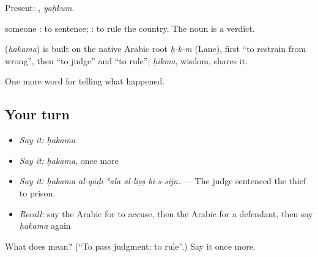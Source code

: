 Present: , \emph{yaḥkum}.

  someone : to sentence;  : to rule the country. The noun  is a verdict.

\begin{cousinweb}
\textbf{} (\emph{ḥakama}) is built on the native Arabic root \emph{ḥ-k-m} (Lane), first \textquotedblleft{}to restrain from wrong\textquotedblright{}, then \textquotedblleft{}to judge\textquotedblright{} and \textquotedblleft{}to rule\textquotedblright{}; \emph{ḥikma}, wisdom, shares it.
\end{cousinweb}

\begin{grammarlens}[title={What you've built}]
One more word for telling what happened.
\end{grammarlens}

\subsection*{Your turn}
\begin{itemize}
\raggedright
  \item \emph{Say it:} \emph{ḥakama}
  \item \emph{Say it:} \emph{ḥakama}, once more
  \item \emph{Say it:} \emph{ḥakama al-qāḍī ʿalā al-liṣṣ bi-s-sijn.} — The judge sentenced the thief to prison.
  \item \emph{Recall:} say the Arabic for to accuse, then the Arabic for a defendant, then say \emph{ḥakama} again
\end{itemize}

\begin{tcolorbox}[breakable,colback=teal!4,colframe=teal!35!black,title={Before you move on}]
What does  mean? (\textquotedblleft{}To pass judgment; to rule\textquotedblright{}.) Say it once more.
\end{tcolorbox}
